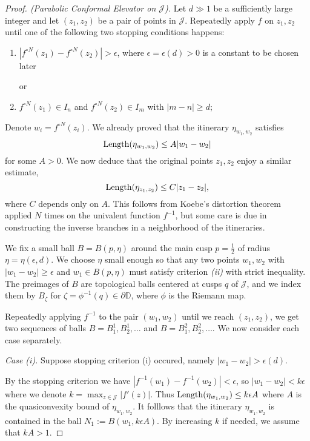 \begin{proof}[Proof. (Parabolic Conformal Elevator on $\mathcal J$)] \label{parabolic-elevator}
Let $d\gg 1$ be a sufficiently large integer and let $(z_1,z_2)$ be a pair of points in $\mathcal J$. Repeatedly apply $f$ on $z_1,z_2$ until one of the following two stopping conditions happens:
\begin{enumerate}[label=\normalfont(\roman*)]
		\item $\left|f^{\circ N}(z_1)-f^{\circ N}(z_2)\right|>\epsilon$, where $\epsilon=\epsilon(d)>0$ is a constant to be chosen later

	or
	\item $f^{\circ N }(z_1) \in I_n$ and $f^{\circ N }(z_2) \in I_m$ with $|m-n| \geq d$;
\end{enumerate}

Denote $w_i=f^{\circ N}(z_i)$. We already proved that the itinerary $\eta_{w_1,w_2}$ satisfies
\begin{equation*}
	\operatorname{Length}(\eta_{w_1,w_2}) \leq A |w_1-w_2|
\end{equation*}
for some $A>0$. We now deduce that the original points $z_1,z_2$ enjoy a similar estimate,
\begin{equation*}
	\operatorname{Length}(\eta_{z_1,z_2}) \leq C |z_1-z_2|,
\end{equation*}
where $C$ depends only on $A$. This follows from Koebe's distortion theorem applied $N$ times on the univalent function $f^{-1}$, but some care is due in constructing the inverse branches in a neighborhood of the itineraries.
	
We fix a small ball $B=B(p,\eta)$ around the main cusp $p=\tfrac 12$ of radius $\eta = \eta (\epsilon, d)$.
We choose $\eta$ small enough so that any two points $w_1,w_2$ with $|w_1-w_2| \geq \epsilon$ and $w_1 \in B(p, \eta)$ must satisfy criterion \emph{(ii)} with strict inequality.
 The preimages of $B$ are topological balls centered at cusps $q$ of $\mathcal J$, and we index them by $B_{\zeta}$ for $\zeta=\phi^{-1}(q) \in \partial \mathbb D$, where $\phi$ is the Riemann map.

Repeatedly applying $f^{-1}$ to the pair $(w_1,w_2)$ until we reach $(z_1,z_2)$, we get two sequences of balls
$B=B^1_1, B^1_2, \dots$ and $B=B^2_1,B^2_2,\dots$. We now consider each case separately.

\emph{Case (i).} Suppose stopping criterion (i) occured, namely $|w_1-w_2| > \epsilon (d)$. 
\begin{comment}
Namely, the points $w_1,w_2$ are a positive distance apart and away from the cusp. Hence also the itinerary $\eta_{w_1,w_2}$ is away from the cusp. 
\end{comment}
By the stopping criterion we have $|f^{-1}(w_1)-f^{-1}(w_2)| < \epsilon$, so  $|w_1-w_2| < k \epsilon$ where we denote $k= \max_{z \in \mathcal J} |f'(z)|$. Thus $\operatorname{Length}(\eta_{w_1,w_2}) \leq k \epsilon A$ where $A$ is the quasiconvexity bound of $\eta_{w_1,w_2}$. It folllows that the itinerary $\eta_{w_1,w_2}$ is contained in the ball $N_1 := B(w_1, k \epsilon A)$.  By increasing $k$ if needed, we assume that $kA>1$.


\end{proof}
